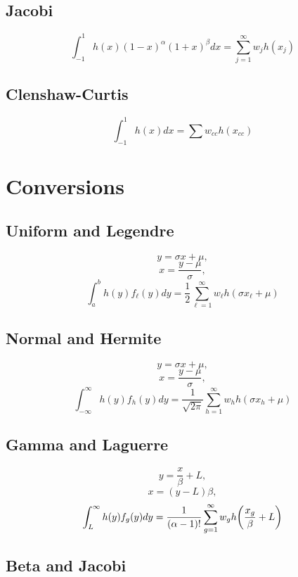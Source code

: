 \documentclass[11pt]{article}
\begin{document}
\subsection{Jacobi}
\begin{equation}
\int_{-1}^1 h(x)(1-x)^\alpha (1+x)^\beta dx = \sum_{j=1}^\infty w_j h(x_j)
\end{equation}

\subsection{Clenshaw-Curtis}
\begin{equation}
\int_{-1}^1 h(x)dx = \sum w_{cc} h(x_{cc})
\end{equation}

\section{Conversions}
\subsection{Uniform and Legendre}
\begin{equation}
y = \sigma x+\mu,
\end{equation}
\begin{equation}
x = \frac{y-\mu}{\sigma},
\end{equation}
\begin{equation}
\int_a^b h(y)f_\ell(y)dy =\frac{1}{2} \sum_{\ell=1}^\infty w_\ell h(\sigma x_\ell+\mu)
\end{equation}

\subsection{Normal and Hermite}
\begin{equation}
y = \sigma x+\mu,
\end{equation}
\begin{equation}
x = \frac{y-\mu}{\sigma},
\end{equation}
\begin{equation}
\int_{-\infty}^\infty h(y)f_h(y)dy =\frac{1}{\sqrt{2\pi}} \sum_{h=1}^\infty w_h h(\sigma x_h+\mu)
\end{equation}

\subsection{Gamma and Laguerre}
\begin{equation}
y = \frac{x}{\beta}+L,
\end{equation}
\begin{equation}
x = (y-L)\beta,
\end{equation}
\begin{equation}
\int_{L}^\infty h(y)f_g(y)dy =\frac{1}{(\alpha-1)!} \sum_{g=1}^\infty w_g h\qty(\frac{x_g}{\beta}+L)
\end{equation}

\subsection{Beta and Jacobi}
\end{document}
